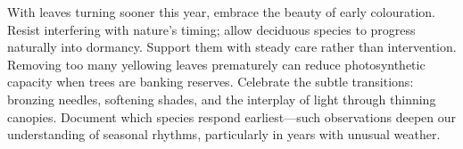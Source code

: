 \medskip  
{}  
\noindent  
With leaves turning sooner this year, embrace the beauty of early colouration. 
Resist interfering with nature's timing; allow deciduous species to progress naturally into dormancy. 
Support them with steady care rather than intervention. 
Removing too many yellowing leaves prematurely can reduce photosynthetic capacity when trees are banking reserves.
Celebrate the subtle transitions: bronzing needles, softening shades, and the interplay of light through thinning canopies. 
Document which species respond earliest---such observations deepen our understanding of seasonal rhythms, particularly in years with unusual weather.
\closearticle  
\clearpage

